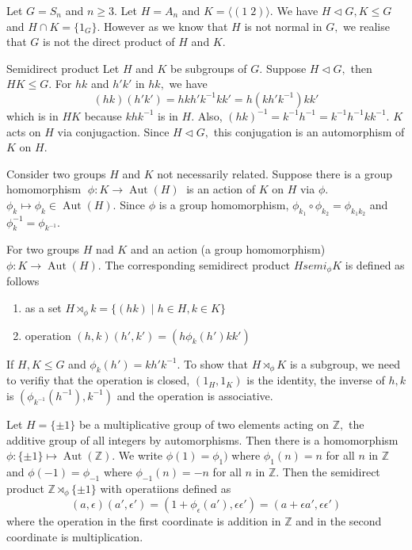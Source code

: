 \begin{example}
	Let $G=  S_n$ and $n \geq 3.$ Let $H =  A_n$ and $ K = \langle ( 1 \; 2 ) \rangle .$
	We have $H \triangleleft G, K \leq G$ and $ H \cap K = \{ 1_G \}.$ However 
	as we know that $H$ is not normal in $G,$ we realise that $G$ is not the direct
	product of $H$ and $K.$
\end{example}

Semidirect product
Let $H$ and $K$ be subgroups of $G.$ Suppose $H \triangleleft G,$ then $HK \leq G.$
For $hk$ and $h'k'$ in $hk,$ we have
$$ (hk)(h'k') = hkh' k^{-1} k k' = h (k h' k^{-1}) kk'$$
which is in $HK$ because $k h k^{-1}$ is in $H.$
Also, $(hk)^{-1} = k^{-1} h^{-1} = k^{-1} h^{-1} k k^{-1} .$
$K$ acts on $H$ via conjugaction. Since $ H \triangleleft G,$ this conjugation
is an automorphism of $K$ on $H.$

Consider two groups $H$ and $K$ not necessarily related. Suppose there is a group 
homomorphism $\; \phi \colon K \to \operatorname{Aut}(H) \;$ is an action of $K$ on $H$ via $ \phi.$
$ \phi_k \mapsto \phi_k \in \operatorname{Aut}(H) .$
Since $ \phi$ is a group homomorphism, $ \phi_{k_1} \circ \phi_{k_2} = \phi_{k_1 k_2}$
and $ \phi_{k}^{-1} = \phi_{k^{-1}}.$


\begin{definition}
	For two groups $H$ nad $K$ and an action (a group homomorphism) $\phi \colon K \to 
	\operatorname{Aut}(H) .$ The corresponding semidirect product $H semi_\phi K$
	is defined as follows
	\begin{enumerate}
		\item as a set $H \rtimes_\phi k = \{ (hk) \; | \; h \in H, k \in K\}$
		\item operation $(h,k) (h',k') = (h \phi_k(h') k k')$
	\end{enumerate}
\end{definition}

If $H, K \leq G$ and $ \phi_k(h') = k h' k^{-1}.$ To show that $H \rtimes_\phi K$
is a subgroup, we need to verifiy that
the operation is closed, $(1_H, 1_K) $ is the identity,
the inverse of $h,k$ is $(\phi_{k^{-1}} (h^{-1} ), k^{-1} )$
and the operation is associative.

\begin{example}
	Let $H = \{ \pm 1 \}$ be a multiplicative group of two elements acting on
	$\mathbb{Z},$ the additive group of all integers by automorphisms. Then 
	there is a homomorphism $ \phi \colon \{ \pm 1 \} \mapsto \operatorname{Aut}
	(\mathbb{Z}).$ We write $\phi(1) = \phi_1)$ where $ \phi_1(n) = n$ 
	for all $n$ in $\mathbb{Z}$ and $ \phi(-1) = \phi_{-1}$ where
	$ \phi_{-1} (n) = -n$ for all $n$ in $\mathbb{Z}.$
	Then the semidirect product $ \mathbb{Z} \rtimes_{ \phi} \{ \pm 1 \}$ with
	operatiions defined as
	$$ (a, \epsilon) (a', \epsilon')=  (1 + \phi_\epsilon(a'), \epsilon \epsilon')
	= (a + \epsilon a', \epsilon \epsilon')$$
	where the operation in the first coordinate is addition in $\mathbb{Z}$ and in the
	second coordinate is multiplication.
\end{example}

